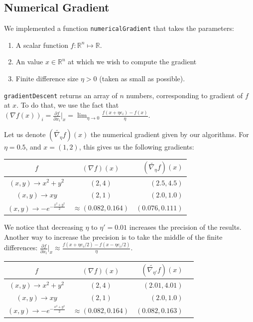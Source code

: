 \subsection{Numerical Gradient}
\label{numGrad}
We implemented a function {\tt numericalGradient}  that takes the parameters:
\begin{enumerate}[-]
\item A scalar function $f: \mathbb{R}^n \mapsto \mathbb{R}$.
\item An value $x \in \mathbb{R}^n$ at which we wish to compute the gradient
\item Finite difference size $\eta > 0$ (taken as small as possible).
\end{enumerate}
 {\tt gradientDescent} returns an array of $n$ numbers, corresponding to gradient of $f$ at $x$.
 To do that, we use the fact that $(\nabla f (x) )_i = \frac{\partial f}{\partial x_i}|_x = \lim_{\eta \to 0} \frac{f(x + \eta e_i) - f(x)}{\eta} $.
 
 Let us denote $(\widetilde{\nabla_{\eta}}f)(x)$ the numerical gradient given by our algorithms. For $\eta = 0.5$,  and $x = (1,2)$, this gives us the following gradients:

\begin{center}
  \begin{tabular}{| c  | c |r |}
    \hline
 $f$ & $(\nabla f) (x)$ & $(\widetilde{\nabla_\eta}f)(x)$\\ \hline
 $(x,y) \to x^2 + y^2$ & $(2, 4) $  & $(2.5, 4.5)$ \\ \hline
 $ (x,y) \to xy$ &    $ (2,1) $ & $(2.0,1.0)$  \\ \hline
 $(x,y) \to -e^{-\frac{x^2 + y^2}{2}}$& $ \approx (0.082, 0.164)$  & $( 0.076, 0.111)$\\
    \hline
  \end{tabular}
\end{center}

We notice that decreasing $\eta$ to $\eta' = 0.01$ increases the precision of the results. Another way to increase the precision is to take the middle of the finite differences: 
$\frac{\partial f}{\partial x_i}|_x \approx  \frac{f(x + \eta e_i / 2) - f(x -  \eta e_i / 2)}{\eta}$.

\begin{center}
  \begin{tabular}{| c  | c |r |r |}
    \hline
 $f$ & $(\nabla f) (x)$ &  $(\widetilde{\nabla_{\eta'}}f)(x)$ \\ \hline
 $(x,y) \to x^2 + y^2$ & $(2, 4) $  & $(2.01, 4.01)$\\ \hline
 $ (x,y) \to xy$ &    $ (2,1) $ &$(2.0, 1.0)$ \\ \hline
 $(x,y) \to -e^{-\frac{x^2 + y^2}{2}}$& $ \approx (0.082, 0.164)$   &  $(0.082, 0.163)$\\
    \hline
  \end{tabular}
\end{center}

